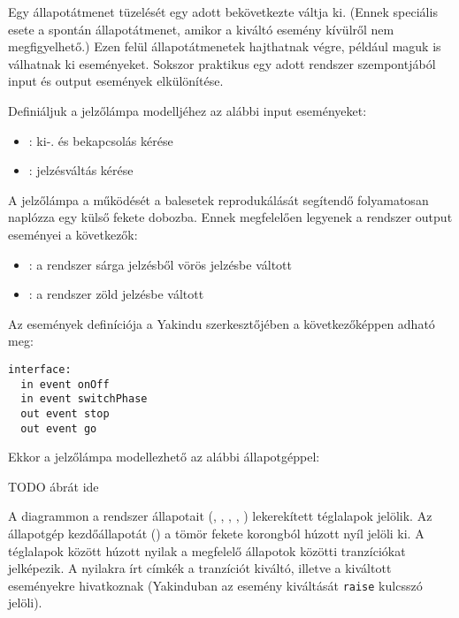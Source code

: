 Egy állapotátmenet tüzelését egy adott  bekövetkezte váltja ki. (Ennek speciális esete a spontán állapotátmenet, amikor a kiváltó esemény kívülről nem megfigyelhető.) Ezen felül állapotátmenetek  hajthatnak végre, például maguk is válhatnak ki eseményeket. Sokszor praktikus egy adott rendszer szempontjából input és output események elkülönítése.

\begin{megjegyzes}
Definiáljuk a jelzőlámpa modelljéhez az alábbi input eseményeket:

\begin{itemize}
	\item {}: ki-. és bekapcsolás kérése
	\item {}: jelzésváltás kérése
\end{itemize}

A jelzőlámpa a működését a balesetek reprodukálását segítendő folyamatosan naplózza egy külső fekete dobozba. Ennek megfelelően legyenek a rendszer output eseményei a következők:

\begin{itemize}
	\item {}: a rendszer sárga jelzésből vörös jelzésbe váltott
	\item {}: a rendszer zöld jelzésbe váltott
\end{itemize}

Az események definíciója a Yakindu szerkesztőjében a következőképpen adható meg:

\begin{lstlisting}
interface:
  in event onOff
  in event switchPhase 
  out event stop
  out event go
\end{lstlisting}

Ekkor a jelzőlámpa modellezhető az alábbi állapotgéppel:

TODO ábrát ide

\end{megjegyzes}



A diagrammon a rendszer állapotait (, , , , ) lekerekített téglalapok jelölik. Az állapotgép kezdőállapotát () a tömör fekete korongból húzott nyíl jelöli ki. A téglalapok között húzott nyilak a megfelelő állapotok közötti tranzíciókat jelképezik. A nyilakra írt címkék a tranzíciót kiváltó, illetve a kiváltott eseményekre hivatkoznak (Yakinduban az esemény kiváltását \lstinline{raise} kulcsszó jelöli).


